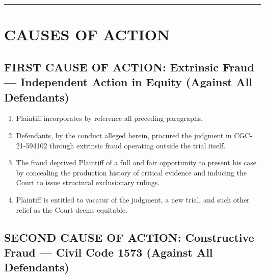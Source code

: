 \begin{center}\rule{0.5\linewidth}{0.5pt}\end{center}

\label{toc:causes-of-action}
\section{CAUSES OF ACTION}\label{causes-of-action}

\subsection{FIRST CAUSE OF ACTION: Extrinsic Fraud --- Independent Action in Equity (Against All Defendants)}\label{first-cause-of-action-extrinsic-fraud-independent-action-in-equity-against-all-defendants}

\begin{enumerate}
\def\labelenumi{\arabic{enumi}.}
\setcounter{enumi}{51}
\item
  Plaintiff incorporates by reference all preceding paragraphs.
\item
  Defendants, by the conduct alleged herein, procured the judgment in CGC-21-594102 through extrinsic fraud operating outside the trial itself.
\item
  The fraud deprived Plaintiff of a full and fair opportunity to present his case by concealing the production history of critical evidence and inducing the Court to issue structural exclusionary rulings.
\item
  Plaintiff is entitled to vacatur of the judgment, a new trial, and such other relief as the Court deems equitable.
\end{enumerate}

\subsection{SECOND CAUSE OF ACTION: Constructive Fraud --- Civil Code \textsection{} 1573 (Against All Defendants)}\label{second-cause-of-action-constructive-fraud-civil-code-1573-against-all-defendants}

